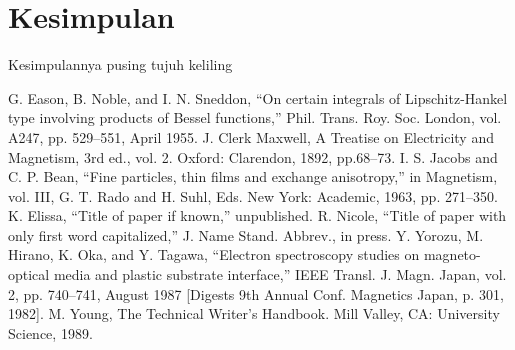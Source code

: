 \documentclass[conference]{IEEEtran}
\begin{document}
\section{Kesimpulan}
Kesimpulannya pusing tujuh keliling

\begin{thebibliography}{00}
 G. Eason, B. Noble, and I. N. Sneddon, ``On certain integrals of Lipschitz-Hankel type involving products of Bessel functions,'' Phil. Trans. Roy. Soc. London, vol. A247, pp. 529--551, April 1955.
 J. Clerk Maxwell, A Treatise on Electricity and Magnetism, 3rd ed., vol. 2. Oxford: Clarendon, 1892, pp.68--73.
 I. S. Jacobs and C. P. Bean, ``Fine particles, thin films and exchange anisotropy,'' in Magnetism, vol. III, G. T. Rado and H. Suhl, Eds. New York: Academic, 1963, pp. 271--350.
 K. Elissa, ``Title of paper if known,'' unpublished.
 R. Nicole, ``Title of paper with only first word capitalized,'' J. Name Stand. Abbrev., in press.
 Y. Yorozu, M. Hirano, K. Oka, and Y. Tagawa, ``Electron spectroscopy studies on magneto-optical media and plastic substrate interface,'' IEEE Transl. J. Magn. Japan, vol. 2, pp. 740--741, August 1987 [Digests 9th Annual Conf. Magnetics Japan, p. 301, 1982].
 M. Young, The Technical Writer's Handbook. Mill Valley, CA: University Science, 1989.
\end{thebibliography}
\end{document}

